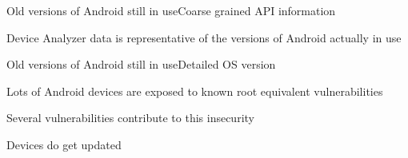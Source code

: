 \documentclass{beamer}
\begin{document}
\begin{frame}{Old versions of Android still in use}{Coarse grained API information}
 \begin{center}
 \end{center}
Device Analyzer data is representative of the versions of Android actually in use
\end{frame}

\begin{frame}{Old versions of Android still in use}{Detailed OS version}
 \begin{center}
  \vspace{-0.5em}
 \end{center}
\end{frame}

\begin{frame}{Lots of Android devices are exposed to known root equivalent vulnerabilities}{}
 \begin{center}
  \vspace{-0.5em}
 \end{center}
\end{frame}

\begin{frame}{Several vulnerabilities contribute to this insecurity}{}
 \begin{center}
  \vspace{-0.5em}
 \end{center}
\end{frame}

\begin{frame}{Devices do get updated}{}
 \begin{center}
  \vspace{-0.5em}
 \end{center}
\end{frame}
\end{document}
